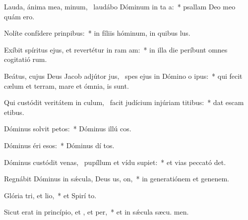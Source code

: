 \item Lauda, ánima mea, minum,~\pscross{} laudábo Dóminum in ta a:~* psallam Deo meo quám ero.
\item Nolíte confídere  prinpibus:~* in fíliis hóminum, in quibus   lus.
\item Exíbit spíritus ejus, et revertétur in ram am:~* in illa die períbunt omnes cogitatió rum.
\item Beátus, cujus Deus Jacob adjútor jus,~\pscross{} spes ejus in Dómino o ipus:~* qui fecit cælum et terram, mare et ómnia,   is sunt.
\item Qui custódit veritátem in culum,~\pscross{} facit judícium injúriam titibus:~* dat escam etibus.
\item Dóminus solvit petos:~* Dóminus illú cos.
\item Dóminus éri esos:~* Dóminus dí tos.
\item Dóminus custódit venas,~\pscross{} pupíllum et vídu supiet:~* et vias peccató det.
\item Regnábit Dóminus in sǽcula, Deus us, on,~* in generatiónem et genenem.
\item Glória tri, et lio,~* et Spirí to.
\item Sicut erat in princípio, et , et per,~* et in sǽcula sæcu. men.

